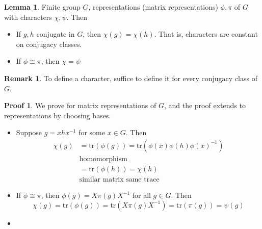 \documentclass{book}
\newcommand{\tr}[1]{\textrm{tr}( #1 )}
\theoremstyle{definition}
\newtheorem{lemma}{Lemma}[chapter]
\theoremstyle{remarkstyle}
\newtheorem*{remark}{Remark}%
\newtheorem*{myproof}{Proof}%
\begin{document}
\begin{lemma}
    Finite group $G$, representations (matrix representations) $\phi,\pi$ of $G$ with characters $\chi,\psi$. Then
    \begin{itemize}
        \item If $g,h$ conjugate in $G$, then $\chi(g)=\chi(h)$. That is, characters are constant on conjugacy classes. 
        \item If $\phi\cong\pi$, then $\chi=\psi$
    \end{itemize}
\end{lemma}
\begin{remark}
    To define a character, suffice to define it for every conjugacy class of $G$.
\end{remark}
\begin{myproof}
    We prove for matrix representations of $G$, and the proof extends to representations by choosing bases. 
    \begin{itemize}
        \item Suppose $g=xhx^{-1} $ for some $x\in G$. Then 
        \begin{align*}
            \chi(g) &= \tr{\phi(g)} = \tr{\phi(x)\phi(h)\phi(x)^{-1}} \\
            &\textrm{homomorphism} \\
            &= \tr{\phi(h)} = \chi(h) \\
            &\textrm{similar matrix same trace}
        \end{align*}
        \item If $\phi\cong\pi$, then $\phi(g)=X\pi(g)X^{-1} $ for all $g\in G$. Then 
        $$
        \chi(g) = \tr{\phi(g)} = \tr{X\pi(g)X^{-1}} = \tr{\pi(g)} = \psi(g)
        $$
        \item[]
    \end{itemize}
\end{myproof}
\end{document}
